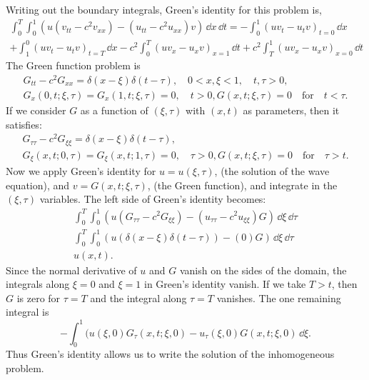 {\begin{Solution}
  Writing out the boundary integrals, Green's identity for this problem is,
  \begin{multline*}
    \int_0^T \int_0^1 \left( u (v_{t t} - c^2 v_{x x}) - (u_{t t} - c^2 u_{x x}) v
    \right) \,\dd x \,\dd t =
    - \int_0^1 (u v_t - u_t v)_{t = 0} \,\dd x 
    \\
    + \int_1^0 (u v_t - u_t v)_{t = T} \,\dd x
    - c^2 \int_0^T (u v_x - u_x v)_{x = 1} \,\dd t
    + c^2 \int_T^1 (u v_x - u_x v)_{x = 0} \,\dd t
  \end{multline*}
  The Green function problem is
  \begin{gather*}
    G_{t t} - c^2 G_{x x} = \delta(x - \xi) \delta(t - \tau), \quad 0 < x,\xi < 1,
    \quad t,\tau > 0, \\
    G_x(0, t; \xi, \tau) = G_x(1, t; \xi, \tau) = 0, \quad t > 0,
    G(x, t; \xi, \tau) = 0 \quad \mathrm{for} \quad t < \tau.
  \end{gather*}
  If we consider $G$ as a function of $(\xi, \tau)$ with $(x, t)$ as 
  parameters, then it satisfies:
  \begin{gather*}
    G_{\tau \tau} - c^2 G_{\xi \xi} = \delta(x - \xi) \delta(t - \tau), \\
    G_\xi(x, t; 0, \tau) = G_\xi(x, t; 1, \tau) = 0, \quad \tau > 0,
    G(x, t; \xi, \tau) = 0 \quad \mathrm{for} \quad \tau > t.
  \end{gather*}
  Now we apply Green's identity for $u = u(\xi, \tau)$, (the solution of 
  the wave equation), and $v = G(x, t; \xi, \tau)$, (the Green function), 
  and integrate in the $(\xi, \tau)$ variables.  The left side of
  Green's identity becomes:
  \begin{gather*}
    \int_0^T \int_0^1 \left( u (G_{\tau\tau} - c^2 G_{\xi\xi}) - 
      (u_{\tau\tau} - c^2 u_{\xi\xi}) G \right) \,\dd \xi \,\dd \tau \\
    \int_0^T \int_0^1 \left( u (\delta(x - \xi) \delta(t - \tau))
      - (0) G \right) \,\dd \xi \,\dd \tau \\
    u(x, t).
  \end{gather*}
  Since the normal derivative of $u$ and $G$ vanish on the sides of the domain,
  the integrals along $\xi = 0$ and $\xi = 1$ in Green's identity vanish.  
  If we take $T > t$, then $G$ is zero for $\tau = T$ and the
  integral along $\tau = T$ vanishes.  The one remaining integral is
  \[
  - \int_0^1 (u(\xi, 0) G_{\tau}(x, t; \xi, 0) - u_\tau(\xi, 0)
  G(x, t; \xi, 0) \,\dd \xi.
  \]
  Thus Green's identity allows us to write the solution of the 
  inhomogeneous problem.

\end{Solution}}
